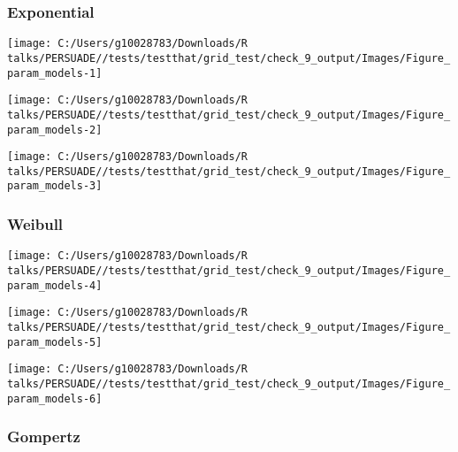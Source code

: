 \documentclass[
]{article}
\begin{document}
\clearpage

\clearpage

\subsubsection{Exponential}\label{exponential}

\begin{flushleft}\texttt{[image: C:/Users/g10028783/Downloads/R talks/PERSUADE//tests/testthat/grid\_test/check\_9\_output/Images/Figure\_param\_models-1]} \end{flushleft}

\begin{flushleft}\texttt{[image: C:/Users/g10028783/Downloads/R talks/PERSUADE//tests/testthat/grid\_test/check\_9\_output/Images/Figure\_param\_models-2]} \end{flushleft}

\begin{flushleft}\texttt{[image: C:/Users/g10028783/Downloads/R talks/PERSUADE//tests/testthat/grid\_test/check\_9\_output/Images/Figure\_param\_models-3]} \end{flushleft}

\clearpage

\subsubsection{Weibull}\label{weibull}

\begin{flushleft}\texttt{[image: C:/Users/g10028783/Downloads/R talks/PERSUADE//tests/testthat/grid\_test/check\_9\_output/Images/Figure\_param\_models-4]} \end{flushleft}

\begin{flushleft}\texttt{[image: C:/Users/g10028783/Downloads/R talks/PERSUADE//tests/testthat/grid\_test/check\_9\_output/Images/Figure\_param\_models-5]} \end{flushleft}

\begin{flushleft}\texttt{[image: C:/Users/g10028783/Downloads/R talks/PERSUADE//tests/testthat/grid\_test/check\_9\_output/Images/Figure\_param\_models-6]} \end{flushleft}

\clearpage

\subsubsection{Gompertz}\label{gompertz}
\end{document}
